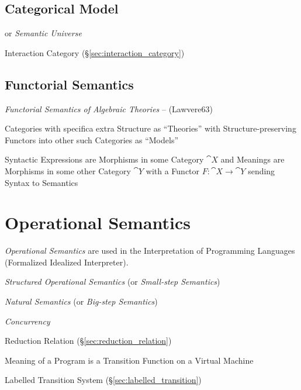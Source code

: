 \subsection{Categorical Model}\label{sec:categorical_model}

or \emph{Semantic Universe}

Interaction Category (\S\ref{sec:interaction_category})



\subsection{Functorial Semantics}\label{sec:functorial_semantics}

\emph{Functorial Semantics of Algebraic Theories} -- (Lawvere63)

Categories with specifica extra Structure as ``Theories'' with
Structure-preserving Functors into other such Categories as ``Models''

Syntactic Expressions are Morphisms in some Category $\cat{X}$ and
Meanings are Morphisms in some other Category $\cat{Y}$ with a Functor
$F : \cat{X} \rightarrow \cat{Y}$ sending Syntax to Semantics



\section{Operational Semantics}\label{sec:operational_semantics}

\emph{Operational Semantics} are used in the Interpretation of
Programming Languages (Formalized Idealized Interpreter).

\emph{Structured Operational Semantics} (or \emph{Small-step Semantics})

\emph{Natural Semantics} (or \emph{Big-step Semantics})

\emph{Concurrency}

Reduction Relation (\S\ref{sec:reduction_relation})

Meaning of a Program is a Transition Function on a Virtual Machine

Labelled Transition System (\S\ref{sec:labelled_transition})

